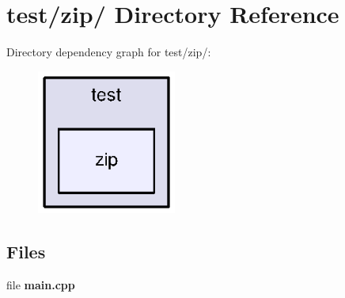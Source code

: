 \section{test/zip/ Directory Reference}
\label{dir_901435b372926299255d3d13bcd265c7}
Directory dependency graph for test/zip/:
\nopagebreak
\begin{figure}[H]
\begin{center}
\leavevmode
\includegraphics[width=130pt]{dir_901435b372926299255d3d13bcd265c7_dep}
\end{center}
\end{figure}
\subsection*{Files}
\begin{DoxyCompactItemize}
\item 
file {\bfseries main.cpp}
\end{DoxyCompactItemize}
